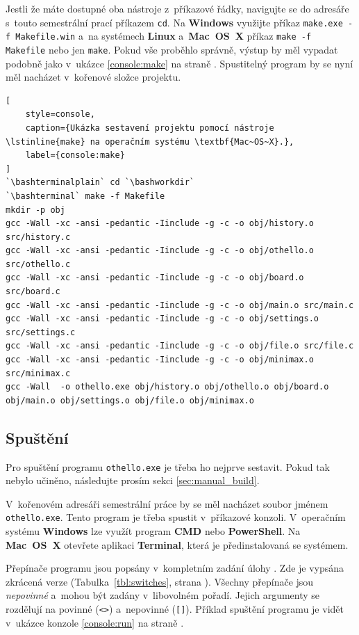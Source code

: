Jestli že máte dostupné oba nástroje z~příkazové řádky, navigujte se do adresáře s~touto semestrální prací příkazem \lstinline{cd}. Na \textbf{Windows} využijte příkaz \lstinline{make.exe -f Makefile.win} a~na systémech \textbf{Linux} a~\textbf{Mac~OS~X} příkaz \lstinline{make -f Makefile} nebo jen \lstinline{make}. Pokud vše proběhlo správně, výstup by měl vypadat podobně jako v~ukázce \ref{console:make} na straně \pageref{console:make}. Spustitelný program by se nyní měl nacházet v~kořenové složce projektu.

\begin{lstlisting}[
	style=console,
	caption={Ukázka sestavení projektu pomocí nástroje \lstinline{make} na operačním systému \textbf{Mac~OS~X}.},
	label={console:make}
]
`\bashterminalplain` cd `\bashworkdir`
`\bashterminal` make -f Makefile
mkdir -p obj
gcc -Wall -xc -ansi -pedantic -Iinclude -g -c -o obj/history.o src/history.c
gcc -Wall -xc -ansi -pedantic -Iinclude -g -c -o obj/othello.o src/othello.c
gcc -Wall -xc -ansi -pedantic -Iinclude -g -c -o obj/board.o src/board.c
gcc -Wall -xc -ansi -pedantic -Iinclude -g -c -o obj/main.o src/main.c
gcc -Wall -xc -ansi -pedantic -Iinclude -g -c -o obj/settings.o src/settings.c
gcc -Wall -xc -ansi -pedantic -Iinclude -g -c -o obj/file.o src/file.c
gcc -Wall -xc -ansi -pedantic -Iinclude -g -c -o obj/minimax.o src/minimax.c
gcc -Wall  -o othello.exe obj/history.o obj/othello.o obj/board.o obj/main.o obj/settings.o obj/file.o obj/minimax.o
\end{lstlisting}

\subsection{Spuštění}

Pro spuštění programu \lstinline{othello.exe} je třeba ho nejprve sestavit. Pokud tak nebylo učiněno, následujte prosím sekci \ref{sec:manual_build}.

V~kořenovém adresáři semestrální práce by se měl nacházet soubor jménem \lstinline{othello.exe}. Tento program je třeba spustit v~příkazové konzoli. V~operačním systému \textbf{Windows} lze využít program \textbf{CMD} nebo \textbf{PowerShell}. Na \textbf{Mac~OS~X} otevřete aplikaci \textbf{Terminal}, která je předinstalovaná se systémem.

Přepínače programu jsou popsány v~kompletním zadání úlohy \cite{assign}. Zde je vypsána zkrácená verze (Tabulka~\ref{tbl:switches}, strana \pageref{tbl:switches}). Všechny přepínače jsou \emph{nepovinné} a~mohou být zadány v~libovolném pořadí. Jejich argumenty se rozdělují na povinné (\texttt{<>}) a~nepovinné (\texttt{[]}). Příklad spuštění programu je vidět v~ukázce konzole \ref{console:run} na straně \pageref{console:run}.

